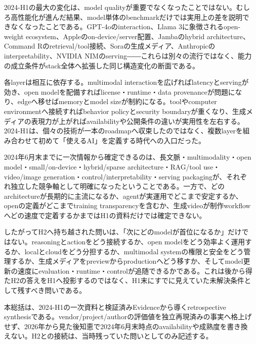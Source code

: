
2024-H1の最大の変化は、model qualityが重要でなくなったことではない。むしろ高性能化が進んだ結果、model単体のbenchmarkだけでは実用上の差を説明できなくなったことである。GPT-4oのinteraction、Llama 3に象徴されるopen-weight ecosystem、Appleのon-device/server配置、Jambaのhybrid architecture、Command Rのretrieval/tool接続、Soraの生成メディア、Anthropicのinterpretability、NVIDIA NIMのserving――これらは別々の流行ではなく、能力の成立条件がstack全体へ拡張した同じ構造変化の断面である。\autocite{src-054d1f81750b,src-0fe343211040,src-2d3a533e91db,src-4ff5ab7d45bc,src-77e35e5f22be,src-b5fbfc0d43e4,src-c89d38f0e830,src-f9616f30e8f5}


各layerは相互に依存する。multimodal interactionを広げればlatencyとservingが効き、open modelを配備すればlicense・runtime・data provenanceが問題になり、edgeへ移せばmemoryとmodel sizeが制約になる。toolやcomputer environmentへ接続すればbehavior policyとsecurity boundaryが重くなり、生成メディアの表現力が上がればavailabilityや公開条件の違いが実用性を左右する。2024-H1は、個々の技術が一本のroadmapへ収束したのではなく、複数layerを組み合わせて初めて「使えるAI」を定義する時代への入口だった。\autocite{src-054d1f81750b,src-0fe343211040,src-2d3a533e91db,src-4ff5ab7d45bc,src-77e35e5f22be,src-c89d38f0e830,src-f9616f30e8f5}


2024年6月末までに一次情報から確定できるのは、長文脈・multimodality・open model・small/on-device・hybrid/sparse architecture・RAG/tool use・video/image generation・control/interpretability・serving packagingが、それぞれ独立した競争軸として明確になったということである。一方で、どのarchitectureが長期的に主流になるか、agentが実運用でどこまで安定するか、openの定義がどこまでtraining transparencyを含むか、生成videoが制作workflowへどの速度で定着するかまではH1の資料だけでは確定できない。\autocite{src-054d1f81750b,src-0fe343211040,src-2d3a533e91db,src-4ff5ab7d45bc,src-77e35e5f22be,src-b5fbfc0d43e4,src-c89d38f0e830,src-f9616f30e8f5}


したがってH2へ持ち越された問いは、「次にどのmodelが首位になるか」だけではない。reasoningとactionをどう接続するか、open modelをどう効率よく運用するか、localとcloudをどう分担するか、multimodal systemの権限と安全をどう管理するか、生成メディアをpreviewからproductionへどう移すか、そしてmodel更新の速度にevaluation・runtime・controlが追随できるかである。これは後から得たH2の答えをH1へ投影するのではなく、H1末にすでに見えていた未解決条件として残すべき問いである。\autocite{src-054d1f81750b,src-0fe343211040,src-2d3a533e91db,src-4ff5ab7d45bc,src-77e35e5f22be,src-b5fbfc0d43e4,src-c89d38f0e830,src-f9616f30e8f5}


\begin{claimboundary}
本総括は、2024-H1の一次資料と検証済みEvidenceから導くretrospective synthesisである。vendor/project/authorの評価値を独立再現済みの事実へ格上げせず、2026年から見た後知恵で2024年6月末時点のavailabilityや成熟度を書き換えない。H2との接続は、当時残っていた問いとしてのみ記述する。\autocite{src-054d1f81750b,src-0fe343211040,src-2d3a533e91db,src-2f7e28810d05,src-4ff5ab7d45bc,src-5019b9256d83,src-77e35e5f22be,src-b5fbfc0d43e4,src-c89d38f0e830,src-edd253654067,src-f9616f30e8f5}
\end{claimboundary}
